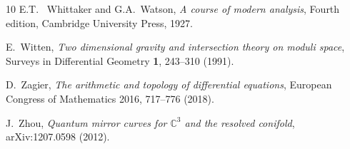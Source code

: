 \documentclass{amsart}
\theoremstyle{definition}
\numberwithin{equation}{section}
\numberwithin{figure}{section}
\newcommand{\bC}{{\mathbb{C}}}
\begin{document}
\begin{thebibliography}{10}
E.T.~ Whittaker and G.A.~Watson,
\emph{A course of modern analysis},
Fourth edition,
Cambridge University Press, 1927.


E.~Witten, \emph{Two dimensional gravity and
intersection
theory on moduli space}, Surveys in
Differential Geometry \textbf{1},
243--310 (1991).


D.~Zagier,
\emph{The arithmetic and topology of differential equations},
European Congress of Mathematics 2016,  717--776 (2018).



J.~Zhou, \emph{Quantum mirror curves for $\bC^3$ and the resolved conifold}, arXiv:1207.0598 (2012).
 

 
    
 


\end{thebibliography}



\end{document}
